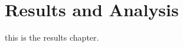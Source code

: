 \chapter{Results and Analysis}

\label{Chapter8_results} 

\begin{comment}
-------------------------------------------------
8. Results and Analysis
-------------------------------------------------
\end{comment}

this is the results chapter. 
